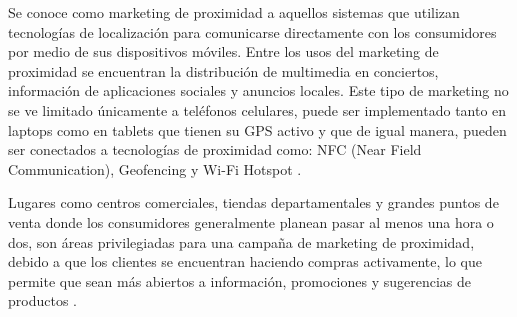 
Se conoce como marketing de proximidad a aquellos sistemas que utilizan tecnologías de localización para comunicarse directamente con los consumidores por medio de sus dispositivos móviles. Entre los usos del marketing de proximidad se encuentran la distribución de multimedia en conciertos, información de aplicaciones sociales y anuncios locales. Este tipo de marketing no se ve limitado únicamente a teléfonos celulares, puede ser implementado tanto en laptops como en tablets que tienen su GPS activo y que de igual manera, pueden ser conectados a tecnologías de proximidad como: NFC (Near Field Communication), Geofencing y Wi-Fi Hotspot \cite{MarketingProx}. \\ \par

Lugares como centros comerciales, tiendas departamentales y grandes puntos de venta donde los consumidores generalmente planean pasar al menos una hora o dos, son áreas privilegiadas para una campaña de marketing de proximidad, debido a que los clientes se encuentran haciendo compras activamente, lo que permite que sean más abiertos a información, promociones y sugerencias de productos \cite{Marketing1}. \\ 